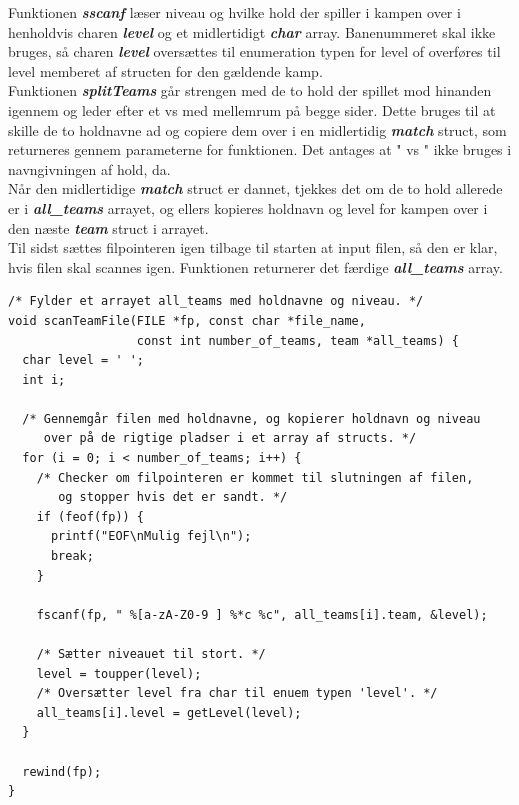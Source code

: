 Funktionen \textbf{\textit{sscanf}} læser niveau og hvilke hold der spiller i kampen over i henholdvis charen \textbf{\textit{level}} og et midlertidigt \textbf{\textit{char}} array. Banenummeret skal ikke bruges, så %
charen \textbf{\textit{level}} oversættes til enumeration typen for level of overføres til level memberet af structen for den gældende kamp.\\
Funktionen \textbf{\textit{splitTeams}} går strengen med de to hold der spillet mod hinanden igennem og leder efter et vs med mellemrum på begge sider. Dette bruges til at skille de to holdnavne ad og copiere dem over i en midlertidig \textbf{\textit{match}} struct, som returneres gennem parameterne for funktionen. Det antages at " vs " ikke bruges i navngivningen af hold, da.\\
Når den midlertidige \textbf{\textit{match}} struct er dannet, tjekkes det om de to hold allerede er i \textbf{\textit{all\_teams}} arrayet, og ellers kopieres holdnavn og level for kampen over i den næste \textbf{\textit{team}} struct i arrayet. \\
Til sidst sættes filpointeren igen tilbage til starten at input filen, så den er klar, hvis filen skal scannes igen. Funktionen returnerer det færdige \textbf{\textit{all\_teams}} array.\\

\begin{listing}[H]
\begin{verbatim}
/* Fylder et arrayet all_teams med holdnavne og niveau. */
void scanTeamFile(FILE *fp, const char *file_name, 
                  const int number_of_teams, team *all_teams) {
  char level = ' ';
  int i;

  /* Gennemgår filen med holdnavne, og kopierer holdnavn og niveau 
     over på de rigtige pladser i et array af structs. */
  for (i = 0; i < number_of_teams; i++) {
    /* Checker om filpointeren er kommet til slutningen af filen,
       og stopper hvis det er sandt. */
    if (feof(fp)) {
      printf("EOF\nMulig fejl\n");
      break;
    }

    fscanf(fp, " %[a-zA-Z0-9 ] %*c %c", all_teams[i].team, &level);

    /* Sætter niveauet til stort. */
    level = toupper(level);
    /* Oversætter level fra char til enuem typen 'level'. */
    all_teams[i].level = getLevel(level);
  }

  rewind(fp);
}
\end{verbatim}
\label{code:scanTeamFile}
\end{listing}

